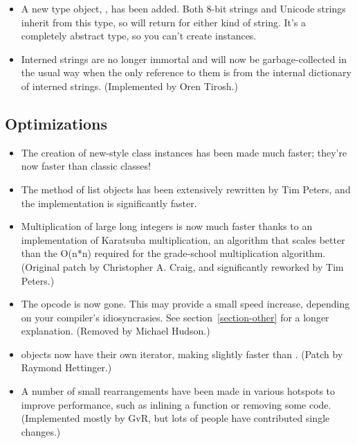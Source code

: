 \documentclass{howto}
\begin{document}
\begin{itemize}
\item A new type object, , has been added.
   Both 8-bit strings and Unicode strings inherit from this type, so
    will return  for
   either kind of string.  It's a completely abstract type, so you
   can't create  instances.

\item Interned strings are no longer immortal and will now be
garbage-collected in the usual way when the only reference to them is
from the internal dictionary of interned strings.  (Implemented by
Oren Tirosh.)

\end{itemize}


\subsection{Optimizations}

\begin{itemize}

\item The creation of new-style class instances has been made much
faster; they're now faster than classic classes!

\item The  method of list objects has been extensively
rewritten by Tim Peters, and the implementation is significantly
faster.

\item Multiplication of large long integers is now much faster thanks
to an implementation of Karatsuba multiplication, an algorithm that
scales better than the O(n*n) required for the grade-school
multiplication algorithm.  (Original patch by Christopher A. Craig,
and significantly reworked by Tim Peters.)

\item The  opcode is now gone.  This may provide a
small speed increase, depending on your compiler's idiosyncrasies.
See section~\ref{section-other} for a longer explanation.
(Removed by Michael Hudson.)

\item {} objects now have their own iterator, making
 slightly faster than
.  (Patch by Raymond Hettinger.)

\item A number of small rearrangements have been made in various
hotspots to improve performance, such as inlining a function or removing
some code.  (Implemented mostly by GvR, but lots of people have
contributed single changes.)    

\end{itemize}
\end{document}
